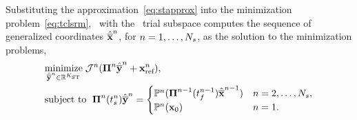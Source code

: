 \begin{comment}
each window, we introduce the space--time trial subspace
$$ \stateArgnt{n} \in \stspaceSTArg{n} \subseteq \RR{N} \otimes \timeSpaceArg{n},$$
along with the space--time trial basis matrix \textit{function}, 
\begin{align*}
\stbasisArgnt{n} &: t \mapsto \stbasis(t) \\
 &: [\timeStartArg{n},\timeEndArg{n}] \rightarrow  \RR{N \times \stdimArg{n}}  ,%
\end{align*}
\KTC{shouldn't be $\equiv$. Look earlier for this. the right hand side should
be on the left with $\defeq$.} with $\Range{\stbasisArgnt{n}} + \stateInterceptArg{} \equiv \stspaceSTArg{n} $ and where $\stdimArg{n}$ is the number of space--time generalized coordinates over the $n$th window. 
For simplicity we assume the reference state to be equivalent for each time window, although no such requirement is necessary. 
\KTC{Remove all commas before equations unless it makes sense gramatically.
Add the $n$ superscript to $x_{ref}$}
The state over each window is approximated by,
\begin{equation}\label{eq:stapprox}
 \stateFOMArg{n}{t} \approx \approxstateArg{n}{t}  = \stbasisArg{n}{t} \stgenstateArg{n} + \stateInterceptArg{},
\end{equation}

\end{comment}
 Substituting the approximation~\eqref{eq:stapprox} into the minimization problem~\eqref{eq:tclsrm}, \methodAcronym\ with 
the \spaceTimeAcronym\ trial subspace computes the sequence of generalized coordinates $\hat{\mathbf{\overline{x}}}^{n}$, for $n=1,\ldots,N_s$, as the solution to the minimization problems,
\begin{align}\label{eq:obj_gen_slab_spacetime}
\begin{split}
&\underset{\hat{\mathbf{\overline{y}}}^{n} \in \mathbb{R}^{K_{\text{ST}}}}{\text{minimize}}\; \mathcal{J}^n( \boldsymbol \Pi^{n} \hat{\mathbf{\overline{y}}}^{n} + \mathbf{x}_\text{ref}^{n} ), \\ 
      &\text{subject to }\;  \boldsymbol \Pi^{n}(t_s^{n})\hat{\mathbf{\overline{y}}}^{n}  =
  \begin{cases} 
\mathbb{P}^n(\boldsymbol \Pi^{n-1}(t_f^{n-1})\hat{\mathbf{\overline{x}}}^{n-1})  & n = 2,\ldots,N_s, \\ 
\mathbb{P}^n({{\mathbf{x}}_0})
 & n=1. \end{cases}
\end{split}
\end{align}
